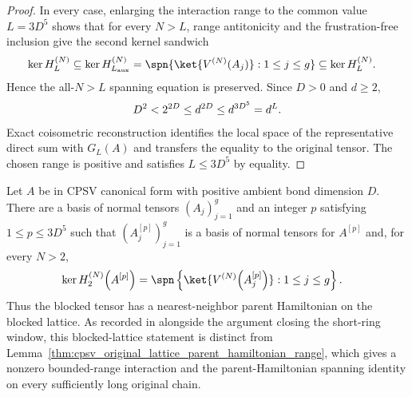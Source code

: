 \begin{proof}
    In every case, enlarging the interaction range to the common value
    $L=3D^5$ shows that for every $N>L$, range antitonicity and the
    frustration-free inclusion give the second kernel sandwich
    \begin{align}
        \ker H_L^{(N)}
         & \subseteq \ker H_{L_{\mathrm{aux}}}^{(N)}
        =\spn\{\ket{V^{(N)}(A_j)}:1\leq j\leq g\}
        \subseteq \ker H_L^{(N)}.
        \notag
    \end{align}
    Hence the all-$N>L$ spanning equation is preserved. Since $D>0$ and
    $d\geq2$,
    \begin{align}
        D^2<2^{2D}\leq d^{2D}\leq d^{3D^5}=d^L.
        \notag
    \end{align}
    Exact coisometric reconstruction identifies the local space of the
    representative direct sum with $G_L(A)$ and transfers the equality to
    the original tensor. The chosen range is positive and satisfies
    $L\leq3D^5$ by equality.
\end{proof}

\begin{lemma}
    \label{thm:cpsv_blocked_nearest_neighbor_parent_hamiltonian}
    \leanok
    Let $A$ be in CPSV canonical form with positive ambient bond
    dimension $D$. There are a basis of normal tensors
    $(A_j)_{j=1}^{g}$ and an integer $p$ satisfying
    $1\leq p\leq 3D^5$ such that $(A_j^{[p]})_{j=1}^{g}$ is a basis of
    normal tensors for $A^{[p]}$ and, for every $N>2$,
    \begin{align}
        \ker H_2^{(N)}\!\left(A^{[p]}\right)
         & =\spn\left\{\ket{V^{(N)}\!\left(A_j^{[p]}\right)}:
        1\leq j\leq g\right\}.
        \label{eq:cpsv_blocked_nearest_neighbor_parent_hamiltonian}
    \end{align}
    Thus the blocked tensor has a nearest-neighbor parent Hamiltonian
    on the blocked lattice. As recorded in
    \cite{gap:cpsv16_parent_hamiltonian_range_short_ring} alongside the
    argument closing the short-ring window, this blocked-lattice statement is
    distinct from
    Lemma~\ref{thm:cpsv_original_lattice_parent_hamiltonian_range}, which
    gives a nonzero bounded-range interaction and the parent-Hamiltonian
    spanning identity on every sufficiently long original chain.
\end{lemma}

